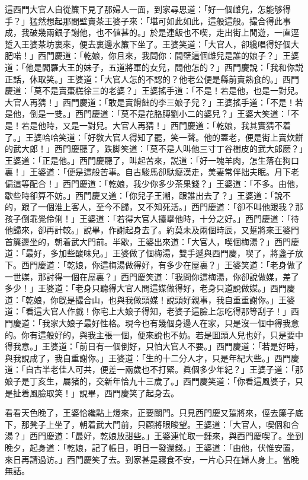 這西門大官人自從簾下見了那婦人一面，到家尋思道：「好一個雌兒，怎能够得手？」猛然想起那間壁賣茶王婆子來：「堪可如此如此，這般這般。撮合得此事成，我破幾兩銀子謝他，也不値甚的。」於是連飯也不喫，走出街上閒遊，一直逕踅入王婆茶坊裏來，便去裏邊水簾下坐了。王婆笑道：「大官人，卻纔唱得好個大肥喏！」西門慶道：「乾娘，你且來，我問你：間壁這個雌兒是誰的娘子？」王婆道：「他是閻羅大王的妹子，五道將軍的女兒，問他怎的？」西門慶說：「我和你説正話，休取笑。」王婆道：「大官人怎的不認的？他老公便是縣前賣熟食的。」西門慶道：「莫不是賣棗糕徐三的老婆？」王婆搖手道：「不是！若是他，也是一對兒。大官人再猜！」西門慶道：「敢是賣餶飿的李三娘子兒？」王婆搖手道：「不是！若是他，倒是一雙。」西門慶道：「莫不是花胳膊劉小二的婆兒？」王婆大笑道：「不是！若是他時，又是一對兒。大官人再猜！」西門慶道：「乾娘，我其實猜不着了。」王婆哈哈笑道：「好敎大官人得知了罷，笑一聲。他的蓋老，便是街上賣炊餅的武大郎！」西門慶聽了，跌脚笑道：「莫不是人叫他三寸丁谷樹皮的武大郎麽？」王婆道：「正是他。」西門慶聽了，叫起苦來，説道：「好一塊羊肉，怎生落在狗口裏！」王婆道：「便是這般苦事。自古駿馬卻馱癡漢走，羙妻常伴拙夫眠。月下老偏這等配合！」西門慶道：「乾娘，我少你多少茶果錢？」王婆道：「不多。由他，歇些時卻算不妨。」西門慶又道：「你兒子王潮，跟誰出去了？」王婆道：「說不的，跟了一個淮上客人，至今不歸，又不知死活。」西門慶道：「卻不叫他跟我？那孩子倒乖覺伶俐！」王婆道：「若得大官人擡擧他時，十分之好。」西門慶道：「待他歸來，卻再計較。」說畢，作謝起身去了。約莫未及兩個時辰，又踅將來王婆門首簾邊坐的，朝着武大門前。半歇，王婆出來道：「大官人，喫個梅湯？」西門慶道：「最好，多加些酸味兒。」王婆做了個梅湯，雙手遞與西門慶，喫了，將盞子放下。西門慶道：「乾娘，你這梅湯做得好，有多少在屋裏？」王婆笑道：「老身做了一世媒，那討得一個在屋裏？」西門慶笑道：「我問你這梅湯，你卻說做媒，差了多少！」王婆道：「老身只聽得大官人問這媒做得好，老身只道說做媒。」西門慶道：「乾娘，你旣是撮合山，也與我做頭媒！說頭好親事，我自重重謝你。」王婆道：「看這大官人作戲！你宅上大娘子得知，老婆子這臉上怎吃得那等刮子！」西門慶道：「我家大娘子最好性格。現今也有幾個身邊人在家，只是沒一個中得我意的。你有這般好的，與我主張一個，便來說也不妨。若是囬頭人兒也好，只是要中得我意。」王婆道：「前日有一個倒好，只怕大官人不要。」西門慶道：「若是好時，與我說成了，我自重謝你。」王婆道：「生的十二分人才，只是年紀大些。」西門慶道：「自古半老佳人可共，便差一兩歲也不打緊。眞個多少年紀？」王婆子道：「那娘子是丁亥生，屬猪的，交新年恰九十三歲了。」西門慶笑道：「你看這風婆子，只是扯着風臉取笑！」說畢，西門慶笑了起身去。

看看天色晚了，王婆恰纔點上燈來，正要關門。只見西門慶又踅將來，俓去簾子底下，那凳子上坐了，朝着武大門前，只顧將眼睃望。王婆道：「大官人，喫個和合湯？」西門慶道：「最好，乾娘放甜些。」王婆連忙取一鍾來，與西門慶喫了。坐到晚夕，起身道：「乾娘，記了帳目，明日一發還錢。」王婆道：「由他，伏惟安置，來日再請過访。」西門慶笑了去。到家甚是寢食不安，一片心只在婦人身上。當晚無話。

